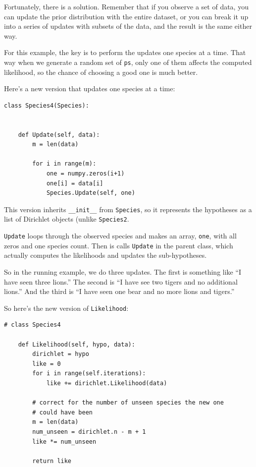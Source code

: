 \documentclass[12pt]{book}
\begin{document}
Fortunately, there is a solution.  Remember that if you observe
a set of data, you can update the prior distribution with the
entire dataset, or you can break it up into a series of updates
with subsets of the data, and the result is the same either way.

For this example, the key is to perform the updates one species at
a time.  That way when we generate a random set of {\tt ps}, only
one of them affects the computed likelihood, so the chance of choosing
a good one is much better.

Here's a new version that updates one species at a time:

\begin{verbatim}
class Species4(Species):

    
    def Update(self, data):
        m = len(data)

        for i in range(m):
            one = numpy.zeros(i+1)
            one[i] = data[i]            
            Species.Update(self, one)
\end{verbatim}

This version inherits \verb"__init__" from {\tt Species}, so it
represents the hypotheses as a list of Dirichlet objects (unlike
{\tt Species2}.

{\tt Update} loops through the observed species and makes an
array, {\tt one}, with all zeros and one species count.  Then
is calls {\tt Update} in the parent class, which actually computes
the likelihoods and updates the sub-hypotheses.

So in the running example, we do three updates.  The first
is something like ``I have seen three lions.''  The second is
``I have see two tigers and no additional lions.''  And the third
is ``I have seen one bear and no more lions and tigers.''

So here's the new version of {\tt Likelihood}:

\begin{verbatim}
# class Species4

    def Likelihood(self, hypo, data):
        dirichlet = hypo
        like = 0
        for i in range(self.iterations):
            like += dirichlet.Likelihood(data)

        # correct for the number of unseen species the new one
        # could have been
        m = len(data)
        num_unseen = dirichlet.n - m + 1
        like *= num_unseen

        return like
\end{verbatim}
\end{document}
